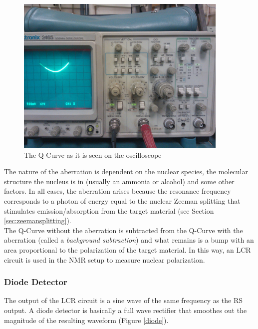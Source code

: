 \begin{figure}
  \centering
  \includegraphics[width=4in,angle=0]{img/NMR-qcurve-scope.jpg}
  \caption{The Q-Curve as it is seen on the oscilloscope}
  \label{NMR-qcurve-scope}
\end{figure}

The nature of the aberration is dependent on the nuclear species, the molecular structure the nucleus is in (usually an ammonia or alcohol) and some other factors.  In all cases, the aberration arises because the resonance frequency corresponds to a photon of energy equal to the nuclear Zeeman splitting that stimulates emission/absorption from the target material (see Section \ref{sec:zeemansplitting}).\\

The Q-Curve without the aberration is subtracted from the Q-Curve with the aberration (called a \textit{background subtraction}) and what remains is a bump with an area proportional to the polarization of the target material. In this way, an LCR circuit is used in the NMR setup to measure nuclear polarization.\\ 

\subsubsection{Diode Detector}
The output of the LCR circuit is a sine wave of the same frequency as the RS output.  A diode detector is basically a full wave rectifier that smoothes out the magnitude of the resulting waveform (Figure \ref{diode}).


